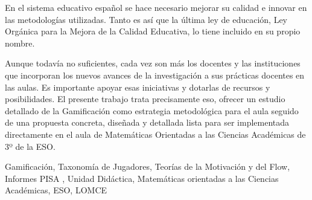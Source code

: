 

En el sistema educativo español se hace necesario mejorar su calidad e innovar en las metodologías utilizadas. 
%
Tanto es así que la última ley de educación, Ley Orgánica para la Mejora de la Calidad Educativa, lo tiene incluido en su propio nombre.

Aunque todavía no suficientes, cada vez son más los docentes y las instituciones que incorporan los nuevos avances de la investigación a sus prácticas docentes en las aulas.
%
Es importante apoyar esas iniciativas y dotarlas de recursos y posibilidades.
%
El presente trabajo trata precisamente eso, ofrecer un estudio detallado de la Gamificación como estrategia metodológica para el aula seguido de una propuesta concreta, diseñada y detallada lista para ser implementada directamente en el aula de Matemáticas Orientadas a las Ciencias Académicas de 3º de la ESO.


\begin{keywordsEs}
Gamificación, Taxonomía de Jugadores, Teorías de la Motivación y del Flow, Informes PISA , Unidad Didáctica, Matemáticas orientadas a las Ciencias Académicas, ESO, LOMCE
\end{keywordsEs}
